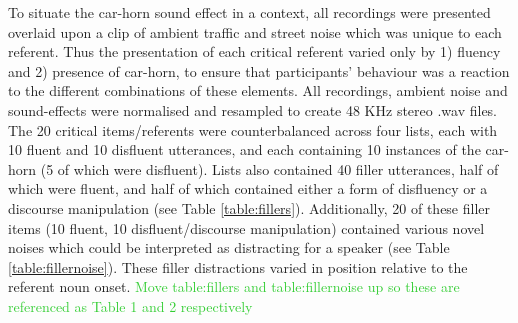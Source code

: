 \documentclass[a4paper,man,natbib]{apa6}
\newcommand\thenote[1]{\textcolor{LimeGreen}{#1}}
\begin{document}
To situate the car-horn sound effect in a context, all recordings were presented overlaid upon a clip of ambient traffic and street noise which was unique to each referent. 
Thus the presentation of each critical referent varied only by 1) fluency and 2) presence of car-horn, to ensure that participants' behaviour was a reaction to the different combinations of these elements. 
All recordings, ambient noise and sound-effects were normalised and resampled to create 48 KHz stereo .wav files.\\

The 20 critical items/referents were counterbalanced across four lists, each with 10 fluent and 10 disfluent utterances, and each containing 10 instances of the car-horn (5 of which were disfluent). 
Lists also contained 40 filler utterances, half of which were fluent, and half of which contained either a form of disfluency or a discourse manipulation (see Table \ref{table:fillers}). 
Additionally, 20 of these filler items (10 fluent, 10 disfluent/discourse manipulation) contained various novel noises which could be interpreted as distracting for a speaker (see Table \ref{table:fillernoise}). 
These filler distractions varied in position relative to the referent noun onset.
\thenote{Move table:fillers and table:fillernoise up so these are referenced as Table 1 and 2 respectively}
\end{document}
